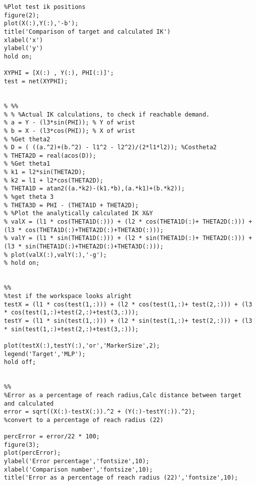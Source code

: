 \documentclass[a4paper,11pt]{article}
\begin{document}
\begin{appendices}
\begin{lstlisting}[style=Matlab-editor,basicstyle=\color{black}\ttfamily\tiny]
%%
%Plot test ik positions
figure(2);
plot(X(:),Y(:),'-b');
title('Comparison of target and calculated IK')
xlabel('x')
ylabel('y')
hold on;

XYPHI = [X(:) , Y(:), PHI(:)]';
test = net(XYPHI);


% %%
% % %Actual IK calculations, to check if reachable demand.
% a = Y - (l3*sin(PHI)); % Y of wrist
% b = X - (l3*cos(PHI)); % X of wrist
% %Get theta2
% D = ( ((a.^2)+(b.^2) - l1^2 - l2^2)/(2*l1*l2)); %Costheta2
% THETA2D = real(acos(D));
% %Get theta1
% k1 = l2*sin(THETA2D);
% k2 = l1 + l2*cos(THETA2D);
% THETA1D = atan2((a.*k2)-(k1.*b),(a.*k1)+(b.*k2));
% %get theta 3
% THETA3D = PHI - (THETA1D + THETA2D);
% %Plot the analytically calculated IK X&Y 
% valX = (l1 * cos(THETA1D(:))) + (l2 * cos(THETA1D(:)+ THETA2D(:))) + (l3 * cos(THETA1D(:)+THETA2D(:)+THETA3D(:)));
% valY = (l1 * sin(THETA1D(:))) + (l2 * sin(THETA1D(:)+ THETA2D(:))) + (l3 * sin(THETA1D(:)+THETA2D(:)+THETA3D(:)));
% plot(valX(:),valY(:),'-g');
% hold on;


%%
%test if the workspace looks alright
testX = (l1 * cos(test(1,:))) + (l2 * cos(test(1,:)+ test(2,:))) + (l3 * cos(test(1,:)+test(2,:)+test(3,:)));
testY = (l1 * sin(test(1,:))) + (l2 * sin(test(1,:)+ test(2,:))) + (l3 * sin(test(1,:)+test(2,:)+test(3,:)));

plot(testX(:),testY(:),'or','MarkerSize',2);
legend('Target','MLP');
hold off;


%%
%Error as a percentage of reach radius,Calc distance between target and calculated
error = sqrt((X(:)-testX(:)).^2 + (Y(:)-testY(:)).^2);
%convert to a percentage of reach radius (22)

percError = error/22 * 100;
figure(3);
plot(percError);
ylabel('Error percentage','fontsize',10);
xlabel('Comparison number','fontsize',10);
title('Error as a percentage of reach radius (22)','fontsize',10);


\end{lstlisting}




\end{appendices}
\end{document}
